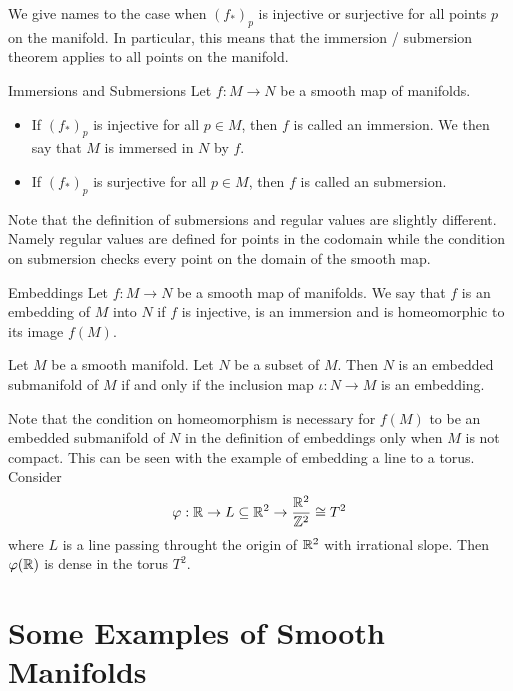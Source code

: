 \documentclass[a4paper]{article}
\begin{document}
We give names to the case when $(f_\ast)_p$ is injective or surjective for all points $p$ on the manifold. In particular, this means that the immersion / submersion theorem applies to all points on the manifold. 

\begin{defn}{Immersions and Submersions}{} Let $f:M\to N$ be a smooth map of manifolds. 
\begin{itemize}
\item If $(f_\ast)_p$ is injective for all $p\in M$, then $f$ is called an immersion. We then say that $M$ is immersed in $N$ by $f$. 
\item If $(f_\ast)_p$ is surjective for all $p\in M$, then $f$ is called an submersion. 
\end{itemize}
\end{defn}

Note that the definition of submersions and regular values are slightly different. Namely regular values are defined for points in the codomain while the condition on submersion checks every point on the domain of the smooth map. 

\begin{defn}{Embeddings}{} Let $f:M\to N$ be a smooth map of manifolds. We say that $f$ is an embedding of $M$ into $N$ if $f$ is injective, is an immersion and is homeomorphic to its image $f(M)$. 
\end{defn}

\begin{prp}{}{} Let $M$ be a smooth manifold. Let $N$ be a subset of $M$. Then $N$ is an embedded submanifold of $M$ if and only if the inclusion map $\iota:N\to M$ is an embedding. 
\end{prp}

Note that the condition on homeomorphism is necessary for $f(M)$ to be an embedded submanifold of $N$ in the definition of embeddings only when $M$ is not compact. This can be seen with the example of embedding a line to a torus. Consider $$\varphi:\mathbb{R}\to L\subseteq\mathbb{R}^2\to\frac{\mathbb{R}^2}{\mathbb{Z}^2}\cong T^2$$ where $L$ is a line passing throught the origin of $\mathbb{R}^2$ with irrational slope. Then $\varphi(\mathbb{R})$ is dense in the torus $T^2$. 

\pagebreak
\section{Some Examples of Smooth Manifolds}
\end{document}
